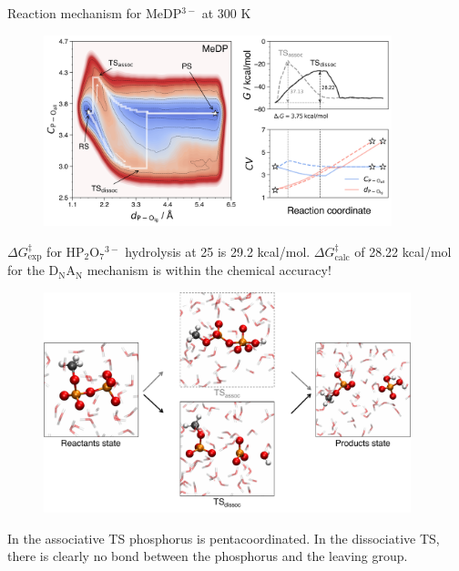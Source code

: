 \documentclass[11pt,t]{beamer}
\begin{document}
\begin{frame}{Reaction mechanism for MeDP$^{3-}$ at 300 K}
	\vspace{-10pt}
	\begin{figure}
		\centering
		\includegraphics[width=0.9\textwidth]{Figures/results_MeDP_300K_fes_mfep.png}
	\end{figure}
	\small
	$\Delta G^\ddagger_\text{exp}$ for HP$_2$O$_7$$^{3-}$ hydrolysis at 25 is 29.2 kcal/mol. $\Delta G^\ddagger_\text{calc}$ of 28.22 kcal/mol for the D$_\text{N}$A$_\text{N}$ mechanism is within the chemical accuracy!
\end{frame}



\begin{frame}
	\vspace{-10pt}
	\begin{figure}
		\centering
		\includegraphics[width=0.95\textwidth]{Figures/results_MeDP_reaction_mechanism_steps.pdf}
	\end{figure}
	\small
	\vspace{-10pt}
	In the associative TS phosphorus is pentacoordinated. In the dissociative TS, there is clearly no bond between the phosphorus and the leaving group.
\end{frame}
\end{document}

